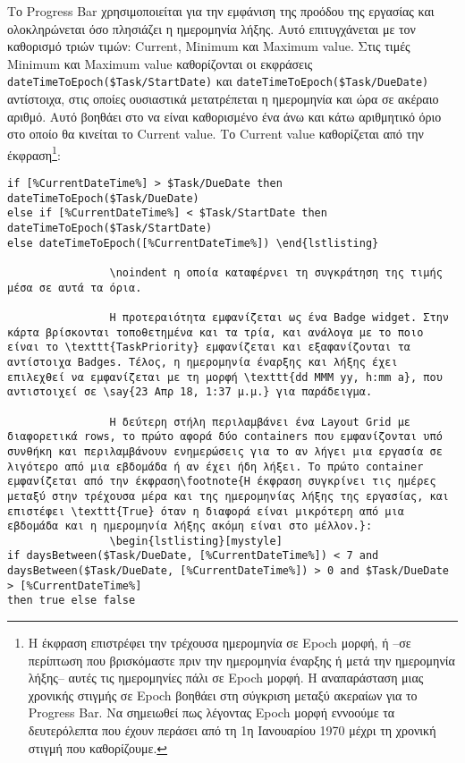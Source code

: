                 Το Progress Bar χρησιμοποιείται για την εμφάνιση της προόδου της εργασίας και ολοκληρώνεται όσο πλησιάζει η ημερομηνία λήξης. Αυτό επιτυγχάνεται με τον καθορισμό τριών τιμών: Current, Minimum και Maximum value. Στις τιμές Minimum και Maximum value καθορίζονται οι εκφράσεις \verb|dateTimeToEpoch($Task/StartDate)| και \verb|dateTimeToEpoch($Task/DueDate)| αντίστοιχα, στις οποίες ουσιαστικά μετατρέπεται η ημερομηνία και ώρα σε ακέραιο αριθμό. Αυτό βοηθάει στο να είναι καθορισμένο ένα άνω και κάτω αριθμητικό όριο στο οποίο θα κινείται το Current value. Το Current value καθορίζεται από την έκφραση\footnote{Η έκφραση επιστρέφει την τρέχουσα ημερομηνία σε Epoch μορφή, ή --σε περίπτωση που βρισκόμαστε πριν την ημερομηνία έναρξης ή μετά την ημερομηνία λήξης-- αυτές τις ημερομηνίες πάλι σε Epoch μορφή. Η αναπαράσταση μιας χρονικής στιγμής σε Epoch βοηθάει στη σύγκριση μεταξύ ακεραίων για το Progress Bar. Να σημειωθεί πως λέγοντας Epoch μορφή εννοούμε τα δευτερόλεπτα που έχουν περάσει από τη 1η Ιανουαρίου 1970 μέχρι τη χρονική στιγμή που καθορίζουμε.}:

                \begin{lstlisting}[mystyle]
if [%CurrentDateTime%] > $Task/DueDate then dateTimeToEpoch($Task/DueDate)
else if [%CurrentDateTime%] < $Task/StartDate then dateTimeToEpoch($Task/StartDate)
else dateTimeToEpoch([%CurrentDateTime%]) \end{lstlisting}

                \noindent η οποία καταφέρνει τη συγκράτηση της τιμής μέσα σε αυτά τα όρια.

                Η προτεραιότητα εμφανίζεται ως ένα Badge widget. Στην κάρτα βρίσκονται τοποθετημένα και τα τρία, και ανάλογα με το ποιο είναι το \texttt{TaskPriority} εμφανίζεται και εξαφανίζονται τα αντίστοιχα Badges. Τέλος, η ημερομηνία έναρξης και λήξης έχει επιλεχθεί να εμφανίζεται με τη μορφή \texttt{dd MMM yy, h:mm a}, που αντιστοιχεί σε \say{23 Απρ 18, 1:37 μ.μ.} για παράδειγμα.

                Η δεύτερη στήλη περιλαμβάνει ένα Layout Grid με διαφορετικά rows, το πρώτο αφορά δύο containers που εμφανίζονται υπό συνθήκη και περιλαμβάνουν ενημερώσεις για το αν λήγει μια εργασία σε λιγότερο από μια εβδομάδα ή αν έχει ήδη λήξει. Το πρώτο container εμφανίζεται από την έκφραση\footnote{Η έκφραση συγκρίνει τις ημέρες μεταξύ στην τρέχουσα μέρα και της ημερομηνίας λήξης της εργασίας, και επιστέφει \texttt{True} όταν η διαφορά είναι μικρότερη από μια εβδομάδα και η ημερομηνία λήξης ακόμη είναι στο μέλλον.}:
                \begin{lstlisting}[mystyle]
if daysBetween($Task/DueDate, [%CurrentDateTime%]) < 7 and daysBetween($Task/DueDate, [%CurrentDateTime%]) > 0 and $Task/DueDate > [%CurrentDateTime%]
then true else false \end{lstlisting}


